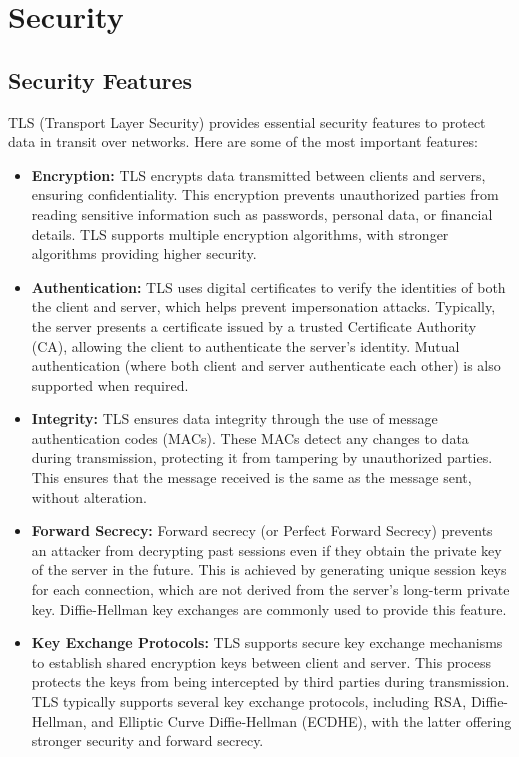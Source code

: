 
\section{Security}


\subsection{Security Features}


TLS (Transport Layer Security) provides essential security features to protect data in transit over networks. Here are some of the most important features:

\begin{itemize}
    \item \textbf{Encryption:} TLS encrypts data transmitted between clients and servers, ensuring confidentiality. This encryption prevents unauthorized parties from reading sensitive information such as passwords, personal data, or financial details. TLS supports multiple encryption algorithms, with stronger algorithms providing higher security.

    \item \textbf{Authentication:} TLS uses digital certificates to verify the identities of both the client and server, which helps prevent impersonation attacks. Typically, the server presents a certificate issued by a trusted Certificate Authority (CA), allowing the client to authenticate the server’s identity. Mutual authentication (where both client and server authenticate each other) is also supported when required.

    \item \textbf{Integrity:} TLS ensures data integrity through the use of message authentication codes (MACs). These MACs detect any changes to data during transmission, protecting it from tampering by unauthorized parties. This ensures that the message received is the same as the message sent, without alteration.

    \item \textbf{Forward Secrecy:} Forward secrecy (or Perfect Forward Secrecy) prevents an attacker from decrypting past sessions even if they obtain the private key of the server in the future. This is achieved by generating unique session keys for each connection, which are not derived from the server’s long-term private key. Diffie-Hellman key exchanges are commonly used to provide this feature.

    \item \textbf{Key Exchange Protocols:} TLS supports secure key exchange mechanisms to establish shared encryption keys between client and server. This process protects the keys from being intercepted by third parties during transmission. TLS typically supports several key exchange protocols, including RSA, Diffie-Hellman, and Elliptic Curve Diffie-Hellman (ECDHE), with the latter offering stronger security and forward secrecy.


\end{itemize}

